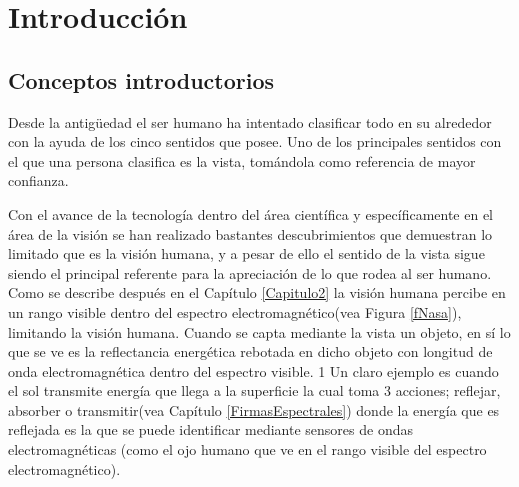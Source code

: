 \chapter{Introducción} %

\label{Capitulo1} %


\newcommand{\keyword}[1]{\textbf{#1}}
\newcommand{\tabhead}[1]{\textbf{#1}}
\newcommand{\code}[1]{\texttt{#1}}
\newcommand{\file}[1]{\texttt{\bfseries#1}}
\newcommand{\option}[1]{\texttt{\itshape#1}}


\section{Conceptos introductorios}

Desde la antigüedad el ser humano ha intentado clasificar todo en su alrededor con la ayuda de los cinco sentidos que posee. Uno de los principales sentidos con el que una persona clasifica es la vista, tomándola como referencia de mayor confianza.

Con el avance de la tecnología dentro del área científica y específicamente en el área de la visión se han realizado bastantes descubrimientos que demuestran lo limitado  que es la visión humana, y a pesar de ello el sentido de la vista sigue siendo el principal referente para la apreciación de lo que rodea al ser humano.
Como se describe después en el Capítulo \ref{Capitulo2} la visión humana percibe en un rango visible dentro del espectro electromagnético(vea Figura \ref{fNasa}), limitando la visión humana.
Cuando se capta mediante la vista un objeto, en sí lo que se ve es la reflectancia energética rebotada en dicho objeto con longitud de onda electromagnética dentro del espectro visible. 1
Un claro ejemplo es cuando el sol transmite energía que llega a la superficie la cual toma 3 acciones; reflejar, absorber o transmitir(vea Capítulo \ref{FirmasEspectrales}) donde la energía que es reflejada es la que se puede identificar mediante sensores de ondas electromagnéticas (como el ojo humano que ve en el rango visible del espectro electromagnético).

